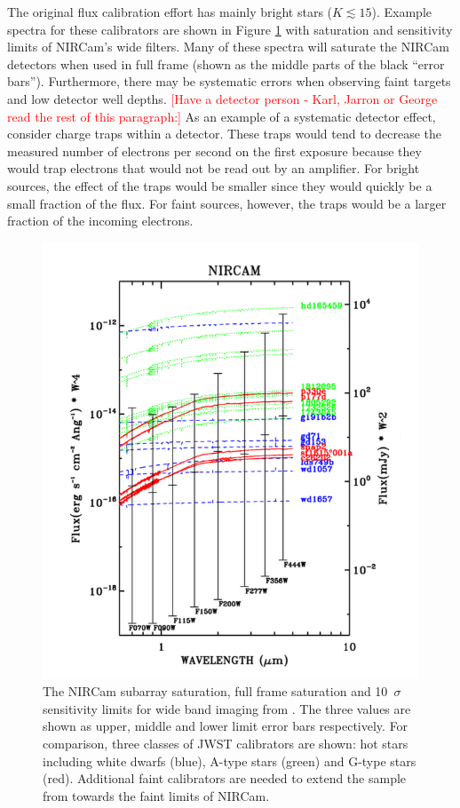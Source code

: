 \documentclass{aastex6}
\begin{document}
The original flux calibration effort has mainly bright stars ($K \lesssim 15$).
Example spectra for these calibrators are shown in Figure \ref{fig:JWStcalsWideF} with saturation and sensitivity limits of NIRCam's wide filters.
Many of these spectra will saturate the NIRCam detectors when used in full frame (shown as the middle parts of the black ``error bars'').
Furthermore, there may be systematic errors when observing faint targets and low detector well depths.
\textcolor{red}{[Have a detector person - Karl, Jarron or George read the rest of this paragraph:]}
As an example of a systematic detector effect, consider charge traps within a detector.
These traps would tend to decrease the measured number of electrons per second on the first exposure because they would trap electrons  that would not be read out by an amplifier.
For bright sources, the effect of the traps would be smaller since they would quickly be a small fraction of the flux.
For faint sources, however, the traps would be a larger fraction of the incoming electrons.

\begin{figure}[!hbtp]
\centering
\includegraphics[width=.6\columnwidth]{nircam_wide_filters.png}
\caption{The NIRCam subarray saturation, full frame saturation and 10~$\sigma$ sensitivity limits for wide band imaging from \citet{gordon2011fluxplan2}. The three values are shown as upper, middle and lower limit error bars respectively. For comparison, three classes of JWST calibrators are shown: hot stars including white dwarfs (blue), A-type stars (green) and G-type stars (red). Additional faint calibrators are needed to extend the sample from \citet{gordon2011fluxplan2} towards the faint limits of NIRCam.}\label{fig:JWStcalsWideF}
\end{figure}
\end{document}
